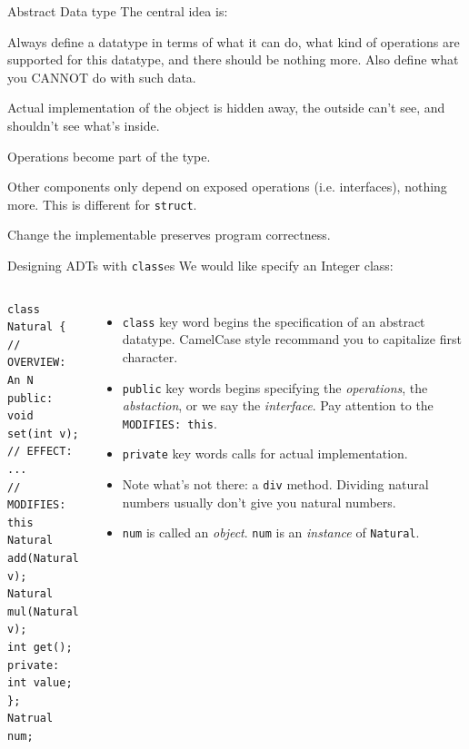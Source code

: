 \begin{frame}{Abstract Data type}
The central idea is:
\begin{center}
\end{center}
Always define a datatype in terms of what it can do, what kind of operations are supported for this datatype, and \alert{there should be nothing more}. Also define what you \alert{CANNOT} do with such data.
\begin{description}
\item[Information Hiding] Actual implementation of the object is hidden away, the outside can't see, and shouldn't see what's inside.
\item[Encapsulation] Operations become part of the type. 
\item[Locality] Other components only depend on exposed operations (i.e. interfaces), nothing more. This is different for \texttt{struct}.
\item[Substitutable] Change the implementable preserves program correctness.
\end{description}
\end{frame}

\begin{frame}[fragile]{Designing ADTs with \texttt{class}es}
We would like specify an Integer class:
\begin{columns}[]

\vspace{-.2in}
\begin{verbatim}
class Natural {
// OVERVIEW: An N
public:
void  set(int v);
// EFFECT:  ...
// MODIFIES: this
Natural  add(Natural v);
Natural  mul(Natural v);
int get();
private:
int value;
};
Natrual num;
\end{verbatim}

\vspace{-.2in}
\begin{itemize}
\small
\item \texttt{class} key word begins the specification of an abstract datatype. CamelCase style recommand you to capitalize first character.
\item \texttt{public} key words begins specifying the \textit{operations}, the \textit{abstaction}, or we say the \textit{interface}. Pay attention to the \texttt{MODIFIES: this}.
\item \texttt{private} key words calls for actual implementation.
\item Note what's not there: a \texttt{div} method. Dividing natural numbers usually don't give you natural numbers.
\item \texttt{num} is called an \textit{object}. \texttt{num} is an \textit{instance} of \texttt{Natural}. 
\end{itemize}
\end{columns}
\end{frame}

